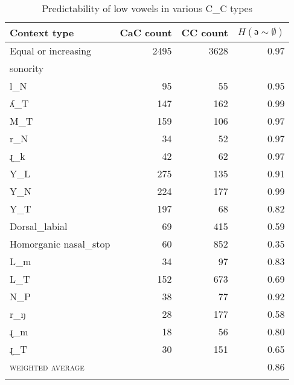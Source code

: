 \documentclass[output=paper,colorlinks,citecolor=brown]{langscibook}
\begin{document}
\begin{table}[t]
\begin{tabular}{lrrr}
\lsptoprule
{Context type} & {CaC count} & {CC count} & $H(\text{ə}\sim\emptyset)$\\
\midrule
Equal or increasing & 2495 & 3628 & 0.97 \\ 
\quad sonority \\
l\_N & 95 & 55 & 0.95\\
{}ʎ\_T & 147 & 162 & 0.99\\
M\_T & 159 & 106 & 0.97\\
r\_N & 34 & 52 & 0.97\\
{}ɻ\_k & 42 & 62 & 0.97\\
Y\_L & 275 & 135 & 0.91\\
Y\_N & 224 & 177 & 0.99\\
Y\_T & 197 & 68 & 0.82\\
Dorsal\_labial & 69 & 415 & 0.59\\
Homorganic nasal\_stop & 60 & 852 & 0.35\\
L\_m & 34 & 97 & 0.83\\
L\_T & 152 & 673 & 0.69\\
N\_P & 38 & 77 & 0.92\\
r\_ŋ & 28 & 177 & 0.58\\
{}ɻ\_m & 18 & 56 & 0.80\\
{}ɻ\_T & 30 & 151 & 0.65\\
\midrule
\textsc{weighted average} &  &  & 0.86\\
\lspbottomrule
\end{tabular}
\caption{Predictability of low vowels in various \textsc{C\_C} types}
\label{tab:mansfield:5}
\end{table}
\end{document}
